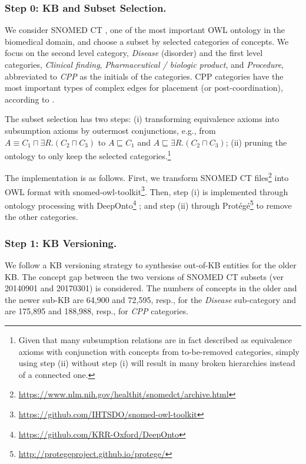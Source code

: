\documentclass[sigconf]{acmart}
\begin{document}
	\subsubsection*{Step 0: KB and Subset Selection.}
	We consider SNOMED CT \cite{donnelly2006snomed}, one of the most important OWL ontology in the biomedical domain, and choose a subset by selected categories of concepts. We focus on the second level category, \textit{Disease} (disorder) and the first level categories, \textit{Clinical finding}, \textit{Pharmaceutical / biologic product}, and \textit{Procedure}, abbreviated to \textit{CPP} as the initials of the categories. CPP categories have the most important types of complex edges for placement (or post-coordination), according to \citet{kate2020}.
	
	The subset selection has two steps: (i) transforming equivalence axioms into subsumption axioms by outermost conjunctions, e.g., from $A \equiv C_1 \sqcap \exists R.(C_2 \sqcap C_3)$ to $A \sqsubseteq C_1$ and $A \sqsubseteq \exists R.(C_2 \sqcap C_3)$; (ii) pruning the ontology to only keep the selected categories.\footnote{Given that many subsumption relations are in fact described as equivalence axioms with conjunction with concepts from to-be-removed categories, simply using step (ii) without step (i) will result in many broken hierarchies instead of a connected one.}
	
	The implementation is as follows. First, we transform SNOMED CT files\footnote{\url{https://www.nlm.nih.gov/healthit/snomedct/archive.html}} into OWL format with snomed-owl-toolkit\footnote{\url{https://github.com/IHTSDO/snomed-owl-toolkit}}. Then, step (i) is implemented through ontology processing with DeepOnto\footnote{\url{https://github.com/KRR-Oxford/DeepOnto}} \cite{he2023deeponto}; and step (ii) through Protégé\footnote{\url{http://protegeproject.github.io/protege/}} to remove the other categories.
	
	\subsubsection*{Step 1: KB Versioning.}
	We follow a KB versioning strategy \cite{dong2023NIL,Iurshina2022nilk} to synthesise out-of-KB entities for the older KB. The concept gap between the two versions of SNOMED CT subsets (ver 20140901 and 20170301) is considered. The numbers of concepts in the older and the newer sub-KB are 64,900 and 72,595, resp., for the \textit{Disease} sub-category and are 175,895 and 188,988, resp., for \textit{CPP} categories.
	
\end{document}
